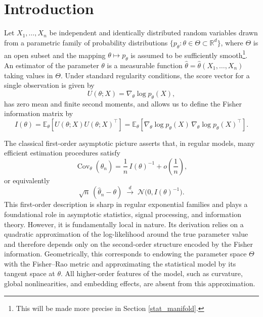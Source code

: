 \documentclass[11pt,letterpaper]{amsart}
\numberwithin{equation}{section}
\theoremstyle{plain}
\theoremstyle{definition}
\theoremstyle{remark}
\begin{document}
\tableofcontents


\section{Introduction}\label{introduction}
Let \(X_1,\dots,X_n\) be independent and identically distributed random variables drawn from a parametric family of probability distributions \(\{p_\theta:\theta\in\Theta\subset\mathbb{R}^d\}\), where \(\Theta\) is an open subset and the mapping \(\theta\mapsto p_\theta\) is assumed to be sufficiently smooth\footnote{This will be made more precise in Section \ref{stat_manifold}.}. An estimator of the parameter \(\theta\) is a measurable function \(\hat\theta=\hat\theta(X_1,\dots,X_n)\) taking values in \(\Theta\). Under standard regularity conditions, the score vector for a single observation is given by
\begin{equation*}
U(\theta;X)=\nabla_\theta \log p_\theta(X),
\end{equation*}
has zero mean and finite second moments, and allows us to define the Fisher information matrix by
\begin{equation*}
I(\theta)
=
\mathbb{E}_\theta\left[U(\theta; X)U(\theta;X)^\top\right]
=
\mathbb{E}_\theta\left[
\nabla_\theta \log p_\theta(X)\,
\nabla_\theta \log p_\theta(X)^\top
\right].
\end{equation*}

The classical first-order asymptotic picture asserts that, in regular models, many efficient estimation procedures satisfy
\begin{equation*}
\operatorname{Cov}_\theta(\hat{\theta}_n)
=
\frac{1}{n}\, I(\theta)^{-1}
+
o\!\left(\frac1n\right),
\end{equation*}
or equivalently
\[
\sqrt n\,(\hat\theta_n-\theta)
\;\xrightarrow{d}\;
\mathcal N\!\bigl(0,I(\theta)^{-1}\bigr).
\]
This first-order description is sharp in regular exponential families and plays a foundational role in asymptotic statistics, signal processing, and information theory. However, it is fundamentally local in nature. Its derivation relies on a quadratic approximation of the log-likelihood around the true parameter value and therefore depends only on the second-order structure encoded by the Fisher information. Geometrically, this corresponds to endowing the parameter space \(\Theta\) with the Fisher--Rao metric and approximating the statistical model by its tangent space at \(\theta\). All higher-order features of the model, such as curvature, global nonlinearities, and embedding effects, are absent from this approximation.
\end{document}
